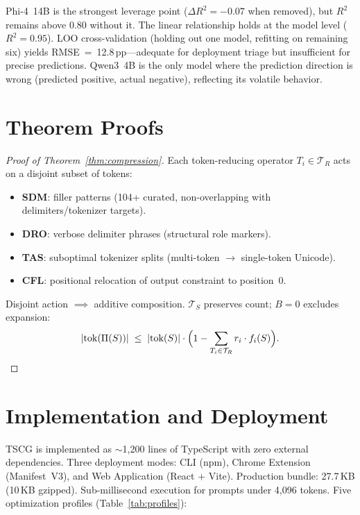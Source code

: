\documentclass[11pt,a4paper]{article}
\newcommand{\tok}{\mathrm{tok}}
\begin{document}
\noindent Phi-4~14B is the strongest leverage point ($\Delta R^2 = -0.07$ when removed), but $R^2$ remains above 0.80 without it. The linear relationship holds at the model level ($R^2 = 0.95$). LOO cross-validation (holding out one model, refitting on remaining six) yields RMSE~=~12.8\,pp---adequate for deployment triage but insufficient for precise predictions. Qwen3~4B is the only model where the prediction direction is wrong (predicted positive, actual negative), reflecting its volatile behavior.

\section{Theorem Proofs}
\label{app:proofs}

\begin{proof}[Proof of Theorem~\ref{thm:compression}]
Each token-reducing operator $T_i \in \mathcal{T}_R$ acts on a disjoint subset of tokens:
\begin{itemize}[noitemsep]
    \item \textbf{SDM}: filler patterns (104+ curated, non-overlapping with delimiters/tokenizer targets).
    \item \textbf{DRO}: verbose delimiter phrases (structural role markers).
    \item \textbf{TAS}: suboptimal tokenizer splits (multi-token $\to$ single-token Unicode).
    \item \textbf{CFL}: positional relocation of output constraint to position~0.
\end{itemize}
Disjoint action $\implies$ additive composition. $\mathcal{T}_S$ preserves count; $B{=}0$ excludes expansion:
\[
    |\tok(\Pi(S))| \;\leq\; |\tok(S)| \cdot \Bigl(1 - \sum_{T_i \in \mathcal{T}_R} r_i \cdot f_i(S)\Bigr). \qedhere
\]
\end{proof}

\section{Implementation and Deployment}
\label{app:deployment}

TSCG is implemented as ${\sim}$1{,}200 lines of TypeScript with zero external dependencies. Three deployment modes: CLI (npm), Chrome Extension (Manifest~V3), and Web Application (React + Vite). Production bundle: 27.7\,KB (10\,KB gzipped). Sub-millisecond execution for prompts under 4{,}096 tokens. Five optimization profiles (Table~\ref{tab:profiles}):
\end{document}
